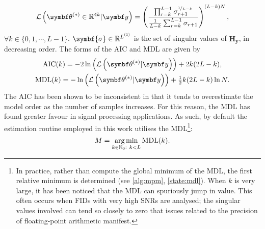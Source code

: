 \begin{equation}
    \mathcal{L}\left(\bthstar \in \mathbb{R}^{4k} | \by\right) = \left(
        \frac{
            \prod_{r=k}^{L-1} \sigma_{r+1}^{\nicefrac{1}{L-k}}
        }{
            \frac{1}{L-k} \sum_{r=k}^{L-1} \sigma_{r+1}
        }
        \right)^{(L - k) N},
        \label{eq:wax-pdf}
\end{equation}
$\forall k \in \lbrace 0, 1, \cdots, L - 1 \rbrace$. $\symbf{\sigma} \in
\mathbb{R}^{\Lone}$ is the set of singular values of $\symbf{H}_{\symbf{y}}$,
in decreasing order. The forms of the \ac{AIC} and \ac{MDL} are given by
\begin{subequations}
    \begin{gather}
        \operatorname{AIC}(k) = -2 \ln\left( \mathcal{L} \left(\bthstar | \by\right) \right) + 2k(2 L - k), \\
        \operatorname{MDL}(k) = -\ln\left( \mathcal{L} \left(\bthstar | \by\right) \right) + \tfrac{1}{2} k(2 L - k) \ln N. \label{eq:mdl}
    \end{gather}
\end{subequations}
The \ac{AIC} has been shown to be inconsistent in that it tends to overestimate
the model order as the number of samples increases\cite{Wax1985}. For this
reason, the \ac{MDL} has found greater favour in signal processing
applications. As such, by default the estimation routine employed in this work
utilises the \ac{MDL}\footnote{
    In practice, rather than compute the global minimum of the \ac{MDL}, the
    first relative minimum is determined (see \cref{alg:mpm},
    \cref{state:mdl}). When $k$ is very large, it has been noticed that the
    \ac{MDL} can spuriously jump in value. This often occurs when \acp{FID}
    with very high \acp{SNR} are analysed; the singular values involved
    can tend so closely to zero that issues related to the precision of
    floating-point arithmetic manifest.
}:
\begin{equation}%
    M = \argmin_{k \in \mathbb{N}_0 :\ k < L} \operatorname{MDL} (k).%
\end{equation}%

